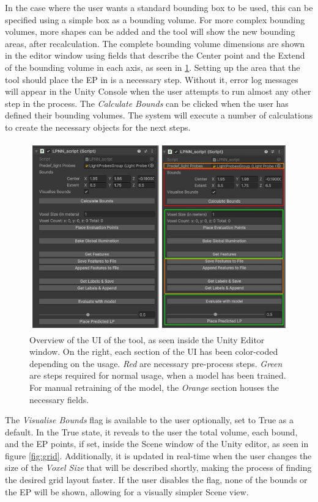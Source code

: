 In the case where the user wants a standard bounding box to be used, this can be specified using a simple box as a bounding volume. For more complex bounding volumes, more shapes can be added and the tool will show the new bounding areas, after recalculation. The complete bounding volume dimensions are shown in the editor window using fields that describe the Center point and the Extend of the bounding volume in each axis, as seen in \ref{fig:UI_editor}. Setting up the area that the tool should place the EP in is a necessary step. Without it, error log messages will appear in the Unity Console when the user attempts to run almost any other step in the process. The \textit{Calculate Bounds} can be clicked when the user has defined their bounding volumes. The system will execute a number of calculations to create the necessary objects for the next steps.\newline

\begin{figure}[h]
	\centering
	\includegraphics[scale=0.53]{Graphics/UI_parent_combined.png}
	\caption{Overview of the UI of the tool, as seen inside the Unity Editor window. On the right, each section of the UI has been color-coded depending on the usage. \textit{Red} are necessary pre-process steps. \textit{Green} are steps required for normal usage, when a model has been trained. For manual retraining of the model, the \textit{Orange} section houses the necessary fields.}
	\label{fig:UI_editor}
\end{figure}


The \textit{Visualise Bounds} flag is available to the user optionally, set to True as a default. In the True state, it reveals to the user the total volume, each bound, and the EP points, if set, inside the Scene window of the Unity editor, as seen in figure \ref{fig:grid}. Additionally, it is updated in real-time when the user changes the size of the \textit{Voxel Size} that will be described shortly, making the process of finding the desired grid layout faster. If the user disables the flag, none of the bounds or the EP will be shown, allowing for a visually simpler Scene view.

